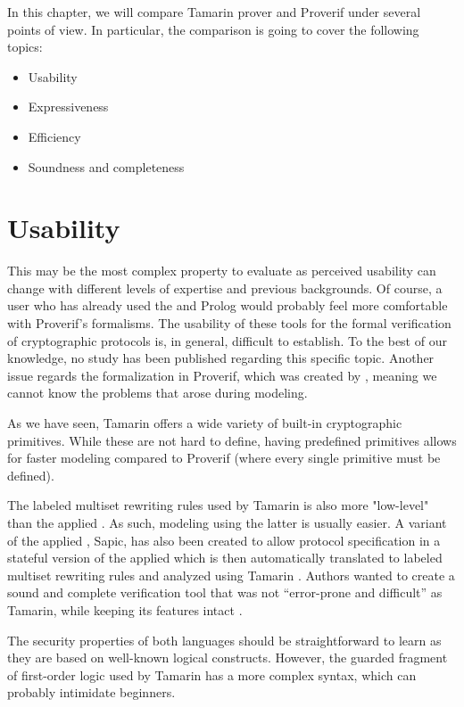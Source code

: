 In this chapter, we will compare Tamarin prover and Proverif under several points of view.
In particular, the comparison is going to cover the following topics:
\begin{itemize}
    \item Usability
    \item Expressiveness
    \item Efficiency
    \item Soundness and completeness
\end{itemize}

\section{Usability}
This may be the most complex property to evaluate as perceived usability can change with different levels of expertise and previous backgrounds. Of course, a user who has already used the \pic{} and Prolog would probably feel more comfortable with Proverif's formalisms. The usability of these tools for the formal verification of cryptographic protocols is, in general, difficult to establish. To the best of our knowledge, no study has been published regarding this specific topic. Another issue regards the formalization in Proverif, which was created by \MMNV{}, meaning we cannot know the problems that arose during modeling.

As we have seen, Tamarin offers a wide variety of built-in cryptographic primitives. While these are not hard to define, having predefined primitives allows for faster modeling compared to Proverif (where every single primitive must be defined).

The labeled multiset rewriting rules used by Tamarin is also more "low-level" than the applied \pic{}. As such, modeling using the latter is usually easier. A variant of the applied \pic{}, Sapic, has also been created to allow protocol specification in a stateful version of the applied \pic{} which is then automatically translated to labeled multiset rewriting rules and analyzed using Tamarin \cite{kremer:hal-00955869}. Authors wanted to create a sound and complete verification tool that was not ``error-prone and difficult'' as Tamarin, while keeping its features intact \cite{sapic-website}.

The security properties of both languages should be straightforward to learn as they are based on well-known logical constructs. However, the guarded fragment of first-order logic used by Tamarin has a more complex syntax, which can probably intimidate beginners.

